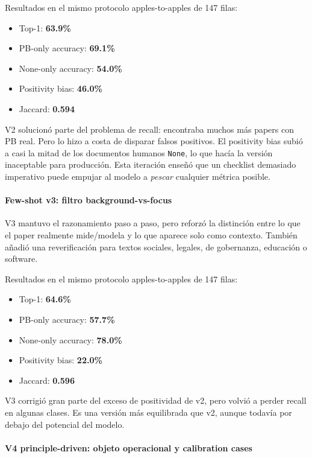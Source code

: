 Resultados en el mismo protocolo apples-to-apples de 147 filas:

\begin{itemize}
\item Top-1: \textbf{63.9\%}
\item PB-only accuracy: \textbf{69.1\%}
\item None-only accuracy: \textbf{54.0\%}
\item Positivity bias: \textbf{46.0\%}
\item Jaccard: \textbf{0.594}
\end{itemize}

V2 solucionó parte del problema de recall: encontraba muchos más papers con PB real. Pero lo hizo a costa de disparar falsos positivos. El positivity bias subió a casi la mitad de los documentos humanos \texttt{None}, lo que hacía la versión inaceptable para producción. Esta iteración enseñó que un checklist demasiado imperativo puede empujar al modelo a \emph{pescar} cualquier métrica posible.

\paragraph*{Few-shot v3: filtro background-vs-focus}

V3 mantuvo el razonamiento paso a paso, pero reforzó la distinción entre lo que el paper realmente mide/modela y lo que aparece solo como contexto. También añadió una reverificación para textos sociales, legales, de gobernanza, educación o software.

Resultados en el mismo protocolo apples-to-apples de 147 filas:

\begin{itemize}
\item Top-1: \textbf{64.6\%}
\item PB-only accuracy: \textbf{57.7\%}
\item None-only accuracy: \textbf{78.0\%}
\item Positivity bias: \textbf{22.0\%}
\item Jaccard: \textbf{0.596}
\end{itemize}

V3 corrigió gran parte del exceso de positividad de v2, pero volvió a perder recall en algunas clases. Es una versión más equilibrada que v2, aunque todavía por debajo del potencial del modelo.

\paragraph*{V4 principle-driven: objeto operacional y calibration cases}

